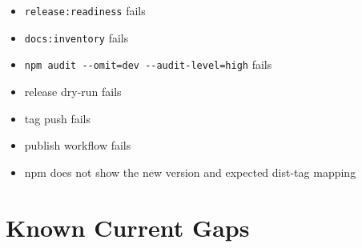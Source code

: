 \begin{itemize}
\item
  \texttt{r\allowbreak{}e\allowbreak{}l\allowbreak{}e\allowbreak{}a\allowbreak{}s\allowbreak{}e\allowbreak{}:\allowbreak{}r\allowbreak{}e\allowbreak{}a\allowbreak{}d\allowbreak{}i\allowbreak{}n\allowbreak{}e\allowbreak{}s\allowbreak{}s} fails
\item
  \texttt{d\allowbreak{}o\allowbreak{}c\allowbreak{}s\allowbreak{}:\allowbreak{}i\allowbreak{}n\allowbreak{}v\allowbreak{}e\allowbreak{}n\allowbreak{}t\allowbreak{}o\allowbreak{}r\allowbreak{}y} fails
\item
  \texttt{n\allowbreak{}p\allowbreak{}m\allowbreak{} \allowbreak{}a\allowbreak{}u\allowbreak{}d\allowbreak{}i\allowbreak{}t\allowbreak{} \allowbreak{}-\allowbreak{}-\allowbreak{}o\allowbreak{}m\allowbreak{}i\allowbreak{}t\allowbreak{}=\allowbreak{}d\allowbreak{}e\allowbreak{}v\allowbreak{} \allowbreak{}-\allowbreak{}-\allowbreak{}a\allowbreak{}u\allowbreak{}d\allowbreak{}i\allowbreak{}t\allowbreak{}-\allowbreak{}l\allowbreak{}e\allowbreak{}v\allowbreak{}e\allowbreak{}l\allowbreak{}=\allowbreak{}h\allowbreak{}i\allowbreak{}g\allowbreak{}h} fails
\item
  release dry-run fails
\item
  tag push fails
\item
  publish workflow fails
\item
  npm does not show the new version and expected dist-tag mapping
\end{itemize}

\section{Known Current Gaps}\label{record-274-known-current-gaps}

